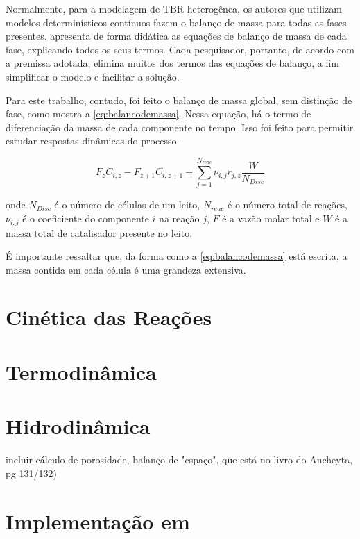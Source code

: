 Normalmente, para a modelagem de TBR heterogênea, os autores que utilizam
modelos determinísticos contínuos fazem o balanço de massa para todas as
fases presentes.  apresenta de forma didática as
equações de balanço de massa de cada fase, explicando todos os seus termos.
Cada pesquisador, portanto, de acordo com a premissa adotada, elimina muitos dos
termos das equações de balanço, a fim simplificar o modelo e facilitar a
solução. 

Para este trabalho, contudo, foi feito o balanço de massa global, sem
distinção de fase, como mostra a \autoref{eq:balancodemassa}. Nessa equação, há
o termo de diferenciação da massa de cada componente no tempo. Isso
foi feito para permitir estudar respostas dinâmicas do processo.

\begin{equation}
F_zC_{i,z} - F_{z+1}C_{i,z+1} + \displaystyle\sum_{j=1}^{N_{reac}}
\nu_{i,j}r_{j,z} \dfrac{W}{N_{Disc}}
\label{eq:balancodemassa}
\end{equation}

onde $N_{Disc}$ é o número de células de um leito, $N_{reac}$ é o número total
de reações, $\nu_{i,j}$ é o coeficiente do componente $i$ na reação $j$, $F$ é a
vazão molar total e $W$ é a massa total de catalisador presente no leito.


É importante ressaltar que, da forma como a \autoref{eq:balancodemassa} está
escrita, a massa contida em cada célula é uma grandeza extensiva. 

\section{Cinética das Reações} \label{sec:cineticadasreacoes}

\section{Termodinâmica} \label{sec:termodinamica}

\section{Hidrodinâmica} \label{sec:hidrodinamica}

incluir cálculo de porosidade, balanço de "espaço", que está no livro do
Ancheyta, pg 131/132)

\section{Implementação em \emso} \label{sec:implementacao}






